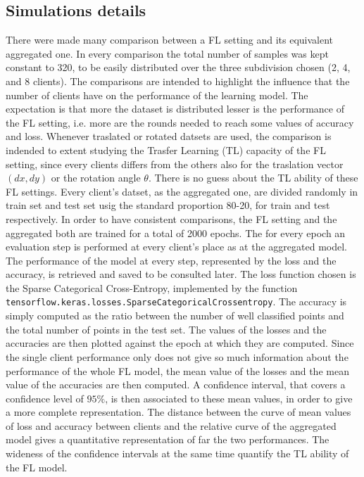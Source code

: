 \documentclass{article} %
\newcounter{points}
\newcounter{other}
\newcounter{late}
\begin{document}
\subsection {Simulations details}
There were made many comparison between a FL setting and its equivalent aggregated one.
In every comparison the total number of samples was kept constant to 320, to be easily 
distributed over the three subdivision chosen (2, 4, and 8 clients).
The comparisons are intended to highlight the influence that the number of clients have 
on the performance of the learning model.
The expectation is that more the dataset is distributed lesser is the performance of 
the FL setting, i.e. more are the rounds needed to reach some values of accuracy and loss.
Whenever traslated or rotated datsets are used, the comparison is indended to extent 
studying the Trasfer Learning (TL) capacity of the FL setting, since every clients differs 
from the others also for the traslation vector $(dx, dy)$ or the rotation angle $\theta$.
There is no guess about the TL ability of these FL settings.
Every client's datset, as the aggregated one, are divided randomly in train set and test 
set usig the standard proportion 80-20, for train and test respectively.
In order to have consistent comparisons, the FL setting and the aggregated both are trained 
for a total of 2000 epochs.
The for every epoch an evaluation step is performed at every client's place as at the 
aggregated model.
The performance of the model at every step, represented by the loss and the accuracy, 
is retrieved and saved to be consulted later.
The loss function chosen is the Sparse Categorical Cross-Entropy, implemented by the
function \verb|tensorflow.keras.losses.SparseCategoricalCrossentropy|.
The accuracy is simply computed as the ratio between the number of well classified points 
and the total number of points in the test set.
The values of the losses and the accuracies are then plotted against the epoch at which they 
are computed.
Since the single client performance only does not give so much information about the 
performance of the whole FL model, the mean value of the losses and the mean value of the 
accuracies are then computed.
A confidence interval, that covers a confidence level of $95\%$, is then associated to 
these mean values, in order to give a more complete representation.
The distance between the curve of mean values of loss and accuracy between clients and the 
relative curve of the aggregated model gives a quantitative representation of far the two 
performances.
The wideness of the confidence intervals at the same time quantify the TL ability of the 
FL model.
\end{document}
